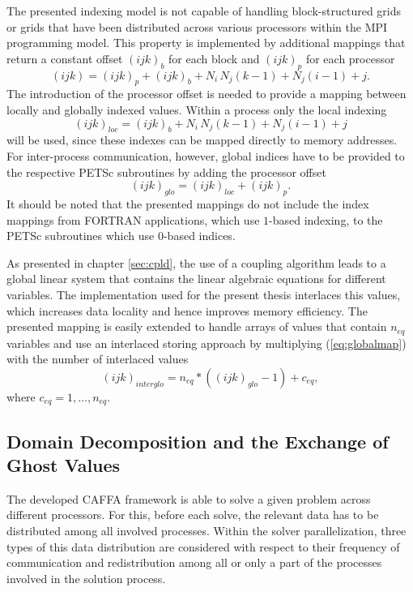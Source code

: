 The presented indexing model is not capable of handling block-structured grids or grids that have been distributed across various processors within the MPI programming model. This property is implemented by additional mappings that return a constant offset \((ijk)_b\) for each block and \((ijk)_p\) for each processor
\begin{displaymath}
  (ijk) = (ijk)_p + (ijk)_b +  N_i \, N_j \left(k - 1\right) + N_j \left(i - 1\right) + j.
\end{displaymath}
The introduction of the processor offset is needed to provide a mapping between locally and globally indexed values. Within a process only the local indexing 
\begin{displaymath}
  (ijk)_{loc} = (ijk)_b +  N_i \, N_j \left(k - 1\right) + N_j \left(i - 1\right) + j
\end{displaymath}
will be used, since these indexes can be mapped directly to memory addresses. For inter-process communication, however, global indices have to be provided to the respective PETSc subroutines by adding the processor offset
\begin{equation}
  \label{eq:globalmap}
  (ijk)_{glo} = (ijk)_{loc} + (ijk)_p.
\end{equation}
It should be noted that the presented mappings do not include the index mappings from FORTRAN applications, which use \(1\)-based indexing, to the PETSc subroutines which use \(0\)-based indices.

As presented in chapter \ref{sec:cpld}, the use of a coupling algorithm leads to a global linear system that contains the linear algebraic equations for different variables. The implementation used for the present thesis interlaces this values, which increases data locality and hence improves memory efficiency. The presented mapping is easily extended to handle arrays of values that contain \(n_{eq}\) variables and use an interlaced storing approach by multiplying (\ref{eq:globalmap}) with the number of interlaced values
\begin{displaymath}
  (ijk)_{interglo} = n_{eq} * \left( (ijk)_{glo}  - 1 \right) + c_{eq},
\end{displaymath}
where \(c_{eq} = 1,\dots,n_{eq} \).

\subsection{Domain Decomposition and the Exchange of Ghost Values}

The developed CAFFA framework is able to solve a given problem across different processors. For this, before each solve, the relevant data has to be distributed among all involved processes. Within the solver parallelization, three types of this data distribution are considered with respect to their frequency of communication and redistribution among all or only a part of the processes involved in the solution process. 

